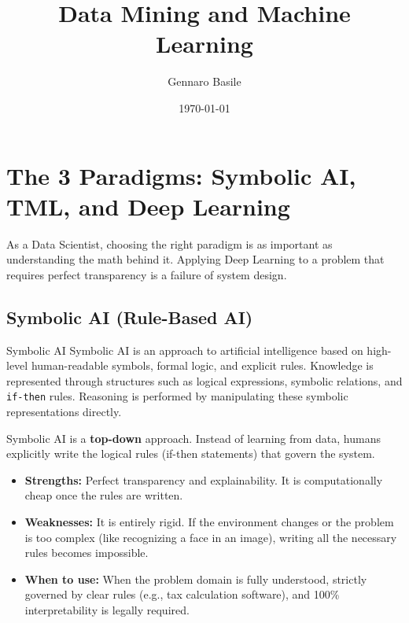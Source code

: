 \documentclass[11pt]{article}
\title{\Huge Data Mining and Machine Learning}
\author{\Large Gennaro Basile}
\date{\today}
\theoremstyle{smallexample}
\begin{document}
\maketitle
{}
\captionsetup[figure]{labelfont=bf}

\pagebreak

\tableofcontents
\pagebreak




\section{The 3 Paradigms: Symbolic AI, TML, and Deep Learning}

As a Data Scientist, choosing the right paradigm is as important as understanding the math behind it. Applying Deep Learning to a problem that requires perfect transparency is a failure of system design.

\subsection{Symbolic AI (Rule-Based AI)}

 \begin{defbox}{Symbolic AI}
 Symbolic AI is an approach to artificial intelligence based on high-level human-readable symbols, formal logic, and explicit rules. Knowledge is represented through structures such as logical expressions, symbolic relations, and \texttt{if-then} rules. Reasoning is performed by manipulating these symbolic representations directly.
 \end{defbox}

Symbolic AI is a \textbf{top-down} approach. Instead of learning from data, humans explicitly write the logical rules (if-then statements) that govern the system.

\begin{itemize}
    \item \textbf{Strengths:} Perfect transparency and explainability. It is computationally cheap once the rules are written.
    \item \textbf{Weaknesses:} It is entirely rigid. If the environment changes or the problem is too complex (like recognizing a face in an image), writing all the necessary rules becomes impossible.
    \item \textbf{When to use:} When the problem domain is fully understood, strictly governed by clear rules (e.g., tax calculation software), and 100\% interpretability is legally required.
\end{itemize}
\end{document}
